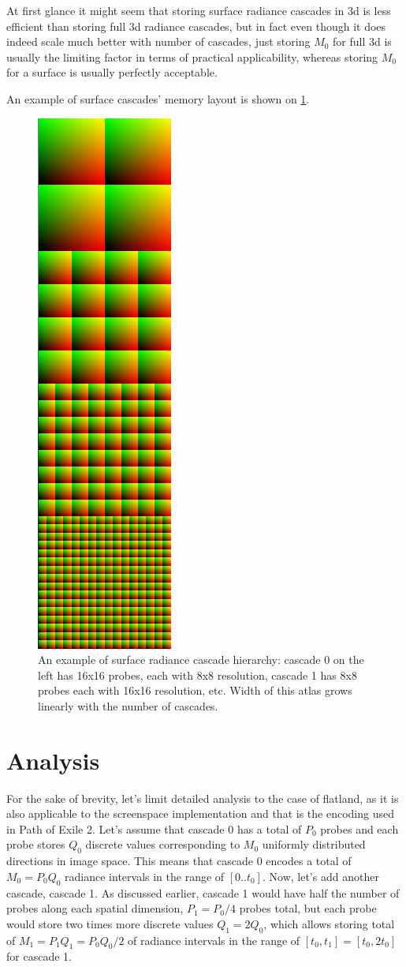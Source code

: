 \documentclass{jcgt}
\begin{document}
At first glance it might seem that storing surface radiance cascades in 3d is less efficient than storing full 3d radiance cascades, but in fact even though it does indeed scale much better with number of cascades, just storing $M_0$ for full 3d is usually the limiting factor in terms of practical applicability, whereas storing $M_0$ for a surface is usually perfectly acceptable.

An example of surface cascades' memory layout is shown on \ref{fig:surface_cascades}.
\begin{figure}[htb]
  \centering
  \includegraphics[height=\columnwidth, angle=-90]{images/surface_cascades.png}
  \caption{\label{fig:surface_cascades}
     An example of surface radiance cascade hierarchy: cascade 0 on the left has 16x16 probes, each with 8x8 resolution, cascade 1 has 8x8 probes each with 16x16 resolution, etc. Width of this atlas grows linearly with the number of cascades.}
\end{figure}

\section{Analysis}

For the sake of brevity, let's limit detailed analysis to the case of flatland, as it is also applicable to the screenspace implementation and that is the encoding used in Path of Exile 2.
Let's assume that cascade 0 has a total of $P_0$ probes and each probe stores $Q_0$ discrete values corresponding to $M_0$ uniformly distributed directions in image space. This means that cascade 0 encodes a total of $M_0=P_0Q_0$ radiance intervals in the range of $[0..t_0]$. Now, let's add another cascade, cascade 1. As discussed earlier, cascade 1 would have half the number of probes along each spatial dimension, $P_1=P_0/4$ probes total, but each probe would store two times more discrete values $Q_1=2Q_0$, which allows storing total of $M_1=P_1Q_1=P_0Q_0/2$ of radiance intervals in the range of $[t_0,t_1]=[t_0,2t_0]$ for cascade 1.
\end{document}
